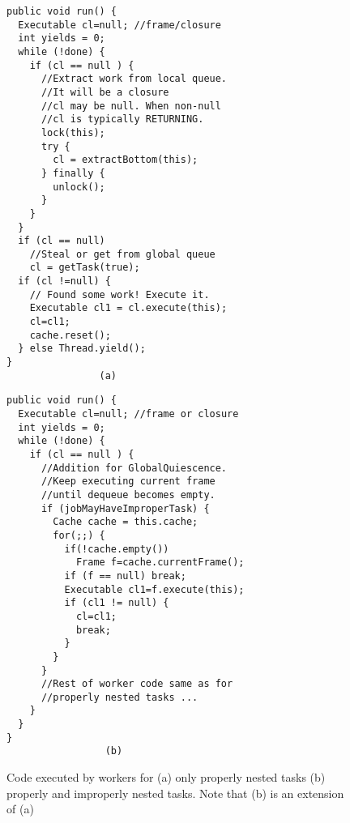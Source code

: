 \begin{figure*}
\begin{minipage}{0.5\textwidth}
\begin{verbatim}
public void run() {
  Executable cl=null; //frame/closure
  int yields = 0;
  while (!done) {
    if (cl == null ) {
      //Extract work from local queue.
      //It will be a closure
      //cl may be null. When non-null
      //cl is typically RETURNING.
      lock(this);
      try {
        cl = extractBottom(this);
      } finally {
        unlock();
      }
    }
  }
  if (cl == null)
    //Steal or get from global queue
    cl = getTask(true);  
  if (cl !=null) {
    // Found some work! Execute it.
    Executable cl1 = cl.execute(this);
    cl=cl1;
    cache.reset();
  } else Thread.yield();
}
                (a)
\end{verbatim}
\end{minipage}%
\begin{minipage}{0.5\textwidth}
\begin{verbatim}
public void run() {
  Executable cl=null; //frame or closure
  int yields = 0;
  while (!done) {
    if (cl == null ) {
      //Addition for GlobalQuiescence. 
      //Keep executing current frame 
      //until dequeue becomes empty.
      if (jobMayHaveImproperTask) {
        Cache cache = this.cache;
        for(;;) {
          if(!cache.empty())
            Frame f=cache.currentFrame();
          if (f == null) break;
          Executable cl1=f.execute(this);
          if (cl1 != null) {
            cl=cl1;
            break;
          }
        }
      } 
      //Rest of worker code same as for
      //properly nested tasks ...
    }
  }
}
                 (b)
\end{verbatim}
\end{minipage}
\caption{Code executed by workers for (a) only properly nested tasks (b)
  properly and improperly nested tasks. Note that (b) is an extension of (a)}
\label{fig:worker-code}
\end{figure*}

